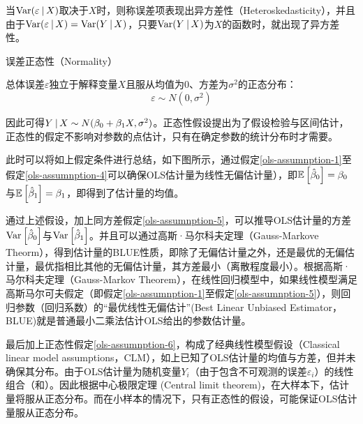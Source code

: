 \documentclass[11pt]{article}
\begin{document}
当$\operatorname{Var}(\varepsilon \:\vert\, X)$取决于$X$时，则称误差项表现出异方差性（Heteroskedasticity），并且由于$\operatorname{Var}(\varepsilon \:\vert\, X) = \operatorname{Var}(Y \:\vert\, X)$，只要$\operatorname{Var}(Y \:\vert\, X)$为$X$的函数时，就出现了异方差性。

\begin{assumption}
    误差正态性（Normality）

    总体误差$\varepsilon$独立于解释变量$X$且服从均值为0、方差为$\sigma^2$的正态分布：
    \begin{equation*}
        \varepsilon \sim N(0,\sigma^2)
    \end{equation*}

    \label{ols-assumnption-6}
\end{assumption}

因此可得$Y \:\vert\, X \sim N(\beta_0+\beta_1 X, \sigma^2)$。正态性假设提出为了假设检验与区间估计，正态性的假定不影响对参数的点估计，只有在确定参数的统计分布时才需要。

此时可以将如上假定条件进行总结，如下图所示，通过假定\ref{ols-assumnption-1}至假定\ref{ols-assumnption-4}可以确保OLS估计量为线性无偏估计量），即$\mathbb{E}\left[\hat{\beta}_0\right]=\beta_0$与$\mathbb{E}\left[\hat{\beta}_1\right]=\beta_1$，即得到了估计量的均值。

通过上述假设，加上同方差假定\ref{ols-assumnption-5}，可以推导OLS估计量的方差$\operatorname{Var}\left[\hat{\beta}_0\right]$与$\operatorname{Var}\left[\hat{\beta}_1\right]$。并且可以通过高斯·马尔科夫定理（Gauss-Markove Theorm），得到估计量的BLUE性质，即除了无偏估计量之外，还是最优的无偏估计量，最优指相比其他的无偏估计量，其方差最小（离散程度最小）。根据高斯·马尔科夫定理（Gauss-Markov Theorem），在线性回归模型中，如果线性模型满足高斯马尔可夫假定（即假定\ref{ols-assumnption-1}至假定\ref{ols-assumnption-5}），则回归参数（回归系数）的“最优线性无偏估计”(Best Linear Unbiased Estimator，BLUE)就是普通最小二乘法估计OLS给出的参数估计量。

最后加上正态性假定\ref{ols-assumnption-6}，构成了经典线性模型假设（Classical linear model assumptions，CLM），如上已知了OLS估计量的均值与方差，但并未确保其分布。由于OLS估计量为随机变量$Y_i$（由于包含不可观测的误差$\varepsilon_i$）的线性组合（和）。因此根据中心极限定理 (Central limit theorem)，在大样本下，估计量将服从正态分布。而在小样本的情况下，只有正态性的假设，可能保证OLS估计量服从正态分布。
\end{document}
